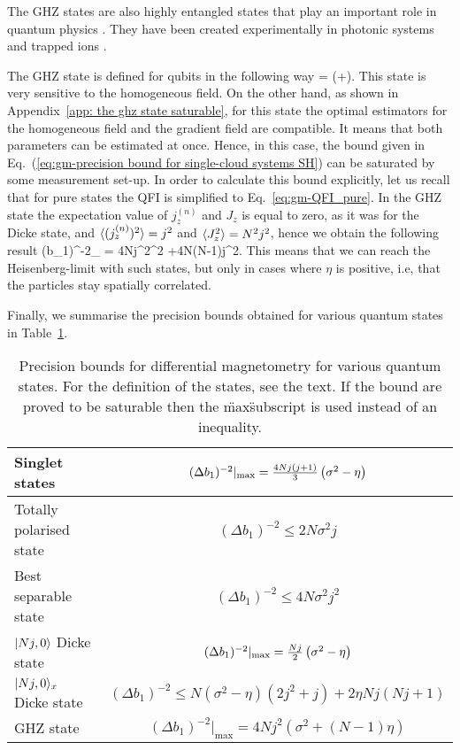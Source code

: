 The GHZ states are also highly entangled states that play an important role in quantum physics \cite{Greenberger1990}.
They have been created experimentally in photonic systems \cite{Pan2000,Yao2012,Lu2007} and trapped ions \cite{Sackett2000,Monz2011}.

The GHZ state is defined for qubits in the following way
\be
\label{eq:gm-definition of ghz}
 = (+).
\ee
This state is very sensitive to the homogeneous field.
On the other hand, as shown in Appendix~\ref{app: the ghz state saturable}, for this state the optimal estimators for the homogeneous field and the gradient field are compatible.
It means that both parameters can be estimated at once.
Hence, in this case, the bound given in Eq.~(\ref{eq:gm-precision bound for single-cloud systems SH}) can be saturated by some measurement set-up.
In order to calculate this bound explicitly, let us recall that for pure states the QFI is simplified to Eq.~\eqref{eq:gm-QFI_pure}.
In the GHZ state the expectation value of $j_z^{(n)}$ and
$J_z$ is equal to zero, as it was for the Dicke state, and $\langle{(j_z^{(n)})^2}\rangle=j^2$ and $\langle{J_z^2}\rangle
= N^2j^2$, hence we obtain the following result
\be
\label{eq:gm-precision bound for ghz}
(\Delta b_1)^{-2}_{\max} = 4Nj^2\sigma^2 +4N(N-1)j^2\eta.
\ee
This means that we can reach the Heisenberg-limit with such states, but only in
cases where $\eta$ is positive, i.e, that the particles stay spatially correlated.


Finally, we summarise the precision bounds obtained for various quantum states in Table~\ref{tab:compare all the states}.
\begin{table}
  \begin{center}
\begin{tabular}{|l|c|}
\hline
Singlet states& $(\Delta b_1)^{-2}|_{\max} =
\tfrac{4Nj(j+1)}{3}\left(\sigma^2-\eta\right) $\\
\hline
Totally polarised state & $(\Delta b_1)^{-2}\leqslant 2N
\sigma^2 j$ \\
\hline
Best separable state & $(\Delta b_1)^{-2} \leqslant 4N
\sigma^2 j^2$ \\
\hline
$\vert{Nj,0}\rangle$ Dicke state & $(\Delta b_1)^{-2}|_{\max} =\tfrac{Nj}{2}\left(
\sigma^2-\eta\right)$\\
\hline
$\vert{Nj,0}\rangle_{x}$ Dicke state & $(\Delta b_1)^{-2}\leqslant
N(\sigma^2 -\eta)(2j^2+j)+ 2\eta Nj(Nj+1)$ \\
\hline
GHZ state & $(\Delta b_1)^{-2}|_{\max} = 4Nj^2(\sigma^2 +(N-1)\eta)$ \\
\hline
\end{tabular}
\end{center}
\caption[Bounds on the precisions for different internal states for gradient magnetometry.]{Precision bounds for  differential magnetometry for various quantum states.
For the definition of the states, see the text.
If the bound are proved to be saturable then
the \"max\" subscript is used instead of an inequality.}
\label{tab:compare all the states}
\end{table}
